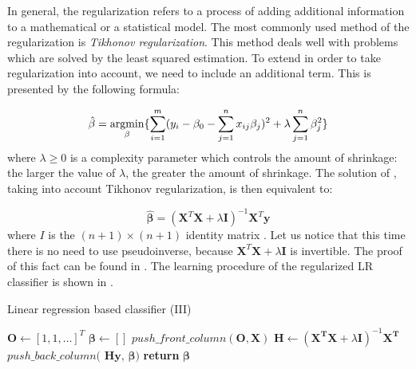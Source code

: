 \documentclass[english,a4paper,twoside]{ppfcmthesis}
\begin{document}
In general, the regularization refers to a process of adding additional information to a mathematical or a statistical model. The most commonly used method of the regularization is \textit{Tikhonov regularization}. This method deals well with problems which are solved by the least squared estimation. To extend  in order to take regularization into account, we need to include an additional term. This is presented by the following formula:

\begin{equation}\label{eq:LR6}
    \hat{\beta} = \operatorname*{argmin}_{\beta}\{\sum\limits_{i=1}^{m}(y_{i}-\beta_0 - \sum\limits_{j=1}^{n}x_{ij}\beta_j)^2+\lambda\sum\limits_{j=1}^{n}\beta_{j}^2\}
\end{equation}
where $\lambda \geq 0$ is a complexity parameter which controls the amount of shrinkage: the larger the value of $\lambda$, the greater the amount of shrinkage.  The solution of , taking into account Tikhonov regularization, is then equivalent to:

\begin{equation}\label{eq:LR7}
    \boldsymbol{\hat{\beta}} = (\boldsymbol{X}^T\boldsymbol{X}+\lambda\boldsymbol{I})^{-1}\boldsymbol{X}^T\boldsymbol{y}
\end{equation}
where $I$ is the $(n+1)\times(n+1)$ identity matrix \citep{Trevor}.
Let us notice that this time there is no need to use pseudoinverse, because $\boldsymbol{X}^T\boldsymbol{X}+\lambda\boldsymbol{I}$ is invertible. The proof of this fact can be found in . The learning procedure of the regularized LR classifier is shown in .

\begin{algorithm}
    \caption{Linear regression based classifier (III)}\label{alg:LR2}
    \begin{algorithmic}[1]
        \State $\boldsymbol{O} \gets [1, 1, \ldots]^T$ 
        \State $\boldsymbol{\beta} \gets []$
        \State $push\_front\_column(\boldsymbol{O}, \boldsymbol{X})$
        \State $\boldsymbol{H} \gets (\boldsymbol{X^T}\boldsymbol{X}+\lambda\boldsymbol{I})^{-1}\boldsymbol{X^T}$
            \State $push\_back\_column($ $\boldsymbol{H}\boldsymbol{y}$, $\boldsymbol{\beta})$ 
        \EndFor
        \State \textbf{return} $\boldsymbol{\beta}$
    \EndFunction
    \end{algorithmic}
\end{algorithm}
\end{document}
